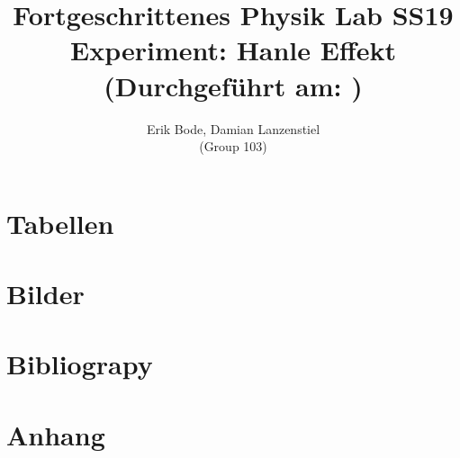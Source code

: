 \documentclass[30pt,a4paper]{article}
\title{
	\large Fortgeschrittenes Physik Lab	SS19 \\[4mm]
	\textbf{\LARGE Experiment: Hanle Effekt
	} \\[4mm]
	(Durchgeführt am: ) \\}
\author{Erik Bode, Damian Lanzenstiel \\ (Group 103)}
\begin{document}
	
	\begin{titlepage}
		\maketitle
		\vspace{2cm}
		\begin{abstract}
		\end{abstract}
	\end{titlepage}
	\newpage
	\tableofcontents
	\newpage
	
		
	
	
	
	
	
	
	\section{Tabellen}
	\listoftables
	\section{Bilder}
	\listoffigures
	\section{Bibliograpy}
	
	
	\section{Anhang}
	
\end{document}
